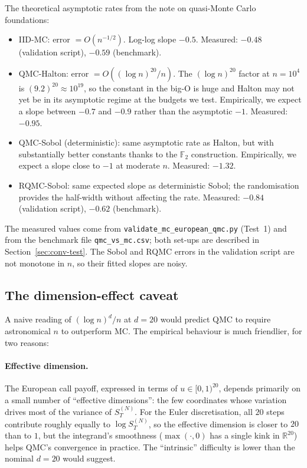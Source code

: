 \documentclass[11pt,a4paper]{article}
\theoremstyle{plain}
\theoremstyle{definition}
\theoremstyle{remark}
\newcommand{\R}{\mathbb{R}}
\begin{document}
The theoretical asymptotic rates from the note on quasi-Monte Carlo
foundations:
\begin{itemize}
\item IID-MC: error $= O(n^{-1/2})$. Log-log slope $-0.5$. Measured:
$-0.48$ (validation script), $-0.59$ (benchmark).
\item QMC-Halton: error $= O((\log n)^{20} / n)$. The $(\log n)^{20}$
factor at $n = 10^4$ is $(9.2)^{20} \approx 10^{19}$, so the constant
in the big-O is huge and Halton may not yet be in its asymptotic
regime at the budgets we test. Empirically, we expect a slope between
$-0.7$ and $-0.9$ rather than the asymptotic $-1$. Measured: $-0.95$.
\item QMC-Sobol (deterministic): same asymptotic rate as Halton,
but with substantially better constants thanks to the $\mathbb{F}_2$
construction. Empirically, we expect a slope close to $-1$ at
moderate $n$. Measured: $-1.32$.
\item RQMC-Sobol: same expected slope as deterministic Sobol; the
randomisation provides the half-width without affecting the rate.
Measured: $-0.84$ (validation script), $-0.62$ (benchmark).
\end{itemize}
The measured values come from \texttt{validate\_mc\_european\_qmc.py}
(Test~1) and from the benchmark file \texttt{qmc\_vs\_mc.csv}; both
set-ups are described in Section~\ref{sec:conv-test}. The Sobol and
RQMC errors in the validation script are not monotone in $n$, so
their fitted slopes are noisy.

\subsection{The dimension-effect caveat}

A naive reading of $(\log n)^d / n$ at $d = 20$ would predict QMC
to require astronomical $n$ to outperform MC. The empirical
behaviour is much friendlier, for two reasons:

\paragraph{Effective dimension.} The European call payoff, expressed
in terms of $u \in [0, 1)^{20}$, depends primarily on a small
number of ``effective dimensions'': the few coordinates whose
variation drives most of the variance of $S_T^{(N)}$. For the Euler
discretisation, all $20$ steps contribute roughly equally to
$\log S_T^{(N)}$, so the effective dimension is closer to $20$ than
to $1$, but the integrand's smoothness ($\max(\cdot, 0)$ has a
single kink in $\R^{20}$) helps QMC's convergence in practice. The
``intrinsic'' difficulty is lower than the nominal $d = 20$ would
suggest.
\end{document}

